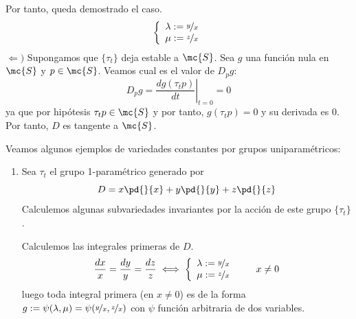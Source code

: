 \begin{dem}
    Por tanto, queda demostrado el caso.
        $$\left\{ \begin{array}{cc}
                \lambda:= \nicefrac{y}{x} \\ \mu:= \nicefrac{z}{x}
            \end{array} \right. $$
        $\Leftarrow)$ Supongamos que $\{\tau_t\}$ deja estable a $\mc{S}$. Sea $g$ una función nula en $\mc{S}$ y $p \in \mc{S}$. Veamos cual es el valor de $D_pg$:
        $$D_pg=\left.\dfrac{dg(\tau_tp)}{dt}\right|_{t=0}=0$$
        ya que por hipótesis $\tau_tp \in \mc{S}$ y por tanto, $g(\tau_tp)=0$ y su derivada es $0$. Por tanto, $D$ es tangente a $\mc{S}$. 
    \end{dem}
    \begin{eje}
        Veamos algunos ejemplos de variedades constantes por grupos uniparamétricos:
        \begin{enumerate}
            \item Sea $\tau_t$ el grupo 1-paramétrico generado por $$D=x \pd{}{x}+y\pd{}{y}+z \pd{}{z}$$
            Calculemos algunas subvariedades invariantes por la acción de este grupo $\{\tau_t\}$.

            Calculemos las integrales primeras de $D$.
            $$\dfrac{dx}{x}=\dfrac{dy}{y}=\dfrac{dz}{z} \iff \left\{ \begin{array}{cc}
                \lambda:= \nicefrac{y}{x} \\ \mu:= \nicefrac{z}{x}
            \end{array} \right. \qquad x \neq 0$$
            luego toda integral primera (en $x \neq 0$) es de la forma $g:=\psi(\lambda,\mu)=\psi( \nicefrac{y}{x}, \nicefrac{z}{x})$ con $\psi$ función arbitraria de dos variables.


\end{enumerate}
\end{eje}
